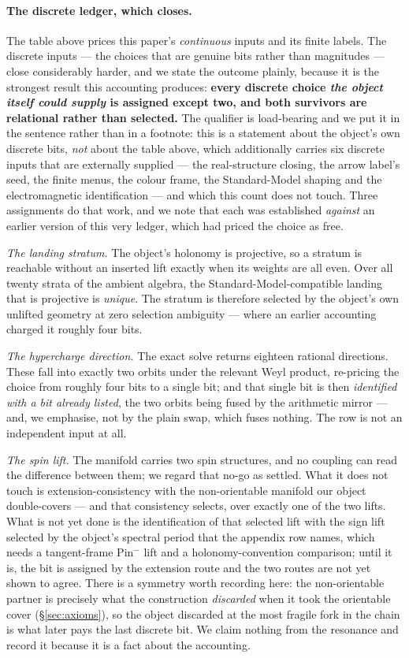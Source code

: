 \documentclass[11pt,a4paper]{article}
\theoremstyle{definition}
\theoremstyle{remark}
\begin{document}
\paragraph{The discrete ledger, which closes.} The table above prices this paper's
\emph{continuous} inputs and its finite labels. The discrete inputs --- the choices that are genuine
bits rather than magnitudes --- close considerably harder, and we state the outcome plainly, because
it is the strongest result this accounting produces: \textbf{every discrete choice \emph{the object itself could supply} is assigned except two, and
both survivors are relational rather than selected.} The qualifier is load-bearing and we put it in
the sentence rather than in a footnote: this is a statement about the object's own discrete bits,
\emph{not} about the table above, which additionally carries six discrete inputs that are externally supplied --- the
real-structure closing, the arrow label's seed, the finite menus, the colour frame, the
Standard-Model shaping and the electromagnetic identification --- and which this count does not touch. Three assignments do that work, and we note that each was established \emph{against} an earlier version of
this very ledger, which had priced the choice as free.

\emph{The landing stratum.} The object's holonomy is projective, so a stratum is reachable without an
inserted lift exactly when its weights are all even. Over all twenty strata of the ambient algebra,
the Standard-Model-compatible landing that is projective is \emph{unique}. The stratum is therefore
selected by the object's own unlifted geometry at zero selection ambiguity --- where an earlier
accounting charged it roughly four bits.

\emph{The hypercharge direction.} The exact solve returns eighteen rational directions. These fall
into exactly two orbits under the relevant Weyl product, re-pricing the choice from roughly four bits
to a single bit; and that single bit is then \emph{identified with a bit already listed}, the two
orbits being fused by the arithmetic mirror --- and, we emphasise, not by the plain swap, which fuses
nothing. The row is not an independent input at all.

\emph{The spin lift.} The manifold carries two spin structures, and no coupling can read the
difference between them; we regard that no-go as settled. What it does not touch is
extension-consistency with the non-orientable manifold our object double-covers --- and that
consistency selects, over exactly one of the two lifts. What is not yet done is the identification of that selected lift
with the sign lift selected by the object's spectral period that the appendix row names, which needs a tangent-frame Pin$^-$ lift and a holonomy-convention
comparison; until it is, the bit is assigned by the extension route and the two routes are not yet shown to agree. There is a symmetry
worth recording here: the non-orientable partner is precisely what the construction \emph{discarded}
when it took the orientable cover (\S\ref{sec:axioms}), so the object discarded at the most fragile
fork in the chain is what later pays the last discrete bit. We claim nothing from the resonance and
record it because it is a fact about the accounting.
\end{document}
